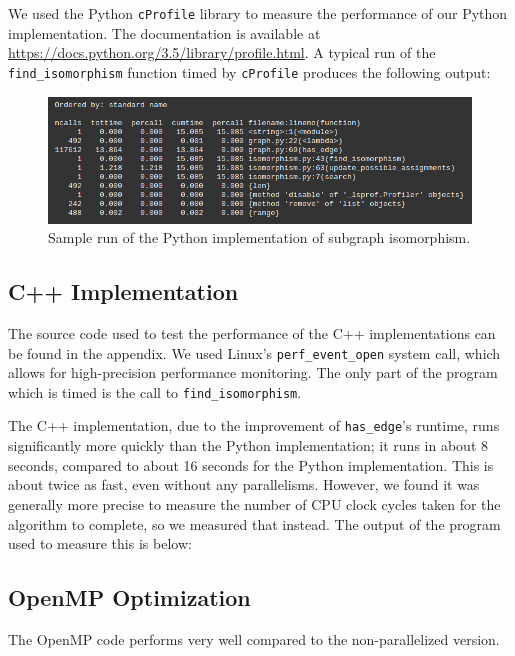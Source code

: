 \documentclass{article}
\begin{document}
  We used the Python \texttt{cProfile} library to measure the performance of our Python implementation. The documentation is available at \url{https://docs.python.org/3.5/library/profile.html}. A typical run of the \texttt{find\_isomorphism} function timed by \texttt{cProfile} produces the following output:

  \begin{figure}[H]
    \centering
    \includegraphics[scale=0.6]{images/perf}
    \caption{Sample run of the Python implementation of subgraph isomorphism.}
  \end{figure}

  \subsection{C++ Implementation}
  The source code used to test the performance of the C++ implementations can be found in the appendix. We used Linux's \texttt{perf\_event\_open} system call, which allows for high-precision performance monitoring. The only part of the program which is timed is the call to \texttt{find\_isomorphism}.

  The C++ implementation, due to the improvement of \texttt{has\_edge}'s runtime, runs significantly more quickly than the Python implementation; it runs in about 8 seconds, compared to about 16 seconds for the Python implementation. This is about twice as fast, even without any parallelisms. However, we found it was generally more precise to measure the number of CPU clock cycles taken for the algorithm to complete, so we measured that instead. The output of the program used to measure this is below:

  \subsection{OpenMP Optimization}
  The OpenMP code performs very well compared to the non-parallelized version.
\end{document}
